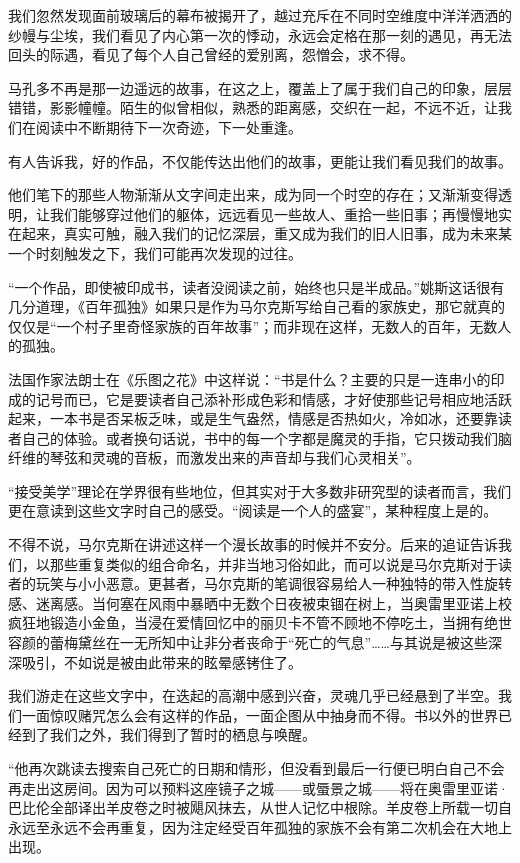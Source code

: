 \documentclass[openany,scheme = chinese, linespread = 1.5]{ctexbook}
\begin{document}
我们忽然发现面前玻璃后的幕布被揭开了，越过充斥在不同时空维度中洋洋洒洒的纱幔与尘埃，我们看见了内心第一次的悸动，永远会定格在那一刻的遇见，再无法回头的际遇，看见了每个人自己曾经的爱别离，怨憎会，求不得。

马孔多不再是那一边遥远的故事，在这之上，覆盖上了属于我们自己的印象，层层错错，影影幢幢。陌生的似曾相似，熟悉的距离感，交织在一起，不远不近，让我们在阅读中不断期待下一次奇迹，下一处重逢。

有人告诉我，好的作品，不仅能传达出他们的故事，更能让我们看见我们的故事。

他们笔下的那些人物渐渐从文字间走出来，成为同一个时空的存在；又渐渐变得透明，让我们能够穿过他们的躯体，远远看见一些故人、重拾一些旧事；再慢慢地实在起来，真实可触，融入我们的记忆深层，重又成为我们的旧人旧事，成为未来某一个时刻触发之下，我们可能再次发现的过往。

“一个作品，即使被印成书，读者没阅读之前，始终也只是半成品。”姚斯这话很有几分道理，《百年孤独》如果只是作为马尔克斯写给自己看的家族史，那它就真的仅仅是“一个村子里奇怪家族的百年故事”；而非现在这样，无数人的百年，无数人的孤独。

法国作家法朗士在《乐图之花》中这样说：“书是什么？主要的只是一连串小的印成的记号而已，它是要读者自己添补形成色彩和情感，才好使那些记号相应地活跃起来，一本书是否呆板乏味，或是生气盎然，情感是否热如火，冷如冰，还要靠读者自己的体验。或者换句话说，书中的每一个字都是魔灵的手指，它只拨动我们脑纤维的琴弦和灵魂的音板，而激发出来的声音却与我们心灵相关”。

“接受美学”理论在学界很有些地位，但其实对于大多数非研究型的读者而言，我们更在意读到这些文字时自己的感受。“阅读是一个人的盛宴”，某种程度上是的。

不得不说，马尔克斯在讲述这样一个漫长故事的时候并不安分。后来的追证告诉我们，以那些重复类似的组合命名，并非当地习俗如此，而可以说是马尔克斯对于读者的玩笑与小小恶意。更甚者，马尔克斯的笔调很容易给人一种独特的带入性旋转感、迷离感。当何塞在风雨中暴晒中无数个日夜被束锢在树上，当奥雷里亚诺上校疯狂地锻造小金鱼，当浸在爱情回忆中的丽贝卡不管不顾地不停吃土，当拥有绝世容颜的蕾梅黛丝在一无所知中让非分者丧命于“死亡的气息”……与其说是被这些深深吸引，不如说是被由此带来的眩晕感铐住了。

我们游走在这些文字中，在迭起的高潮中感到兴奋，灵魂几乎已经悬到了半空。我们一面惊叹赌咒怎么会有这样的作品，一面企图从中抽身而不得。书以外的世界已经到了我们之外，我们得到了暂时的栖息与唤醒。

“他再次跳读去搜索自己死亡的日期和情形，但没看到最后一行便已明白自己不会再走出这房间。因为可以预料这座镜子之城——或蜃景之城——将在奥雷里亚诺·巴比伦全部译出羊皮卷之时被飓风抹去，从世人记忆中根除。羊皮卷上所载一切自永远至永远不会再重复，因为注定经受百年孤独的家族不会有第二次机会在大地上出现。
\end{document}

